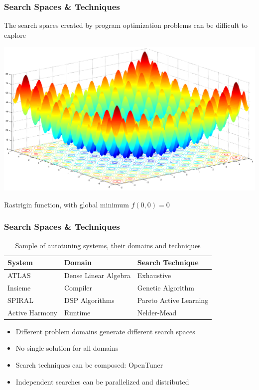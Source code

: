 \documentclass[10pt, compress, aspectratio=169]{beamer}
\begin{document}
\begin{frame}
    \frametitle{Search Spaces \& Techniques}
    The \alert{search spaces} created by program optimization problems can be
    \alert{difficult to explore}

    \begin{center}
        \includegraphics[width=.6\textwidth]{rastrigin}

        Rastrigin function, with \alert{global minimum} $f(0,0) = 0$
    \end{center}
\end{frame}

\begin{frame}
    \frametitle{Search Spaces \& Techniques}
    \begin{table}[]
        \centering
        \begin{tabular}{@{}lll@{}}
            \toprule
            System & Domain & Search Technique \\ \midrule
            ATLAS & Dense Linear Algebra & Exhaustive \\
            Insieme & Compiler & Genetic Algorithm \\
            SPIRAL & DSP Algorithms & Pareto Active Learning \\
            Active Harmony & Runtime & Nelder-Mead \\ \bottomrule
        \end{tabular}
        \caption{Sample of autotuning systems, their domains and techniques}
    \end{table}

    \begin{itemize}
        \item Different \alert{problem domains} generate different \alert{search spaces}
        \item \alert{No single solution} for all domains
        \item Search techniques can be composed: \alert{OpenTuner}
        \item Independent searches can be \alert{parallelized and distributed}
    \end{itemize}
\end{frame}
\end{document}
